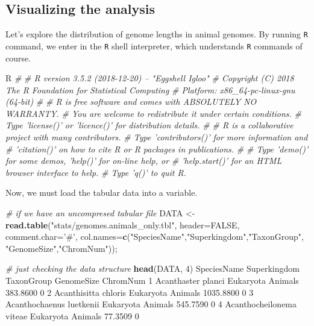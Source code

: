 \documentclass[10pt,a4paper,]{article}
\newenvironment{Shaded}{}{}
\newcommand{\CommentTok}[1]{\textcolor[rgb]{0.38,0.63,0.69}{\textit{#1}}}
\newcommand{\DataTypeTok}[1]{\textcolor[rgb]{0.56,0.13,0.00}{#1}}
\newcommand{\DecValTok}[1]{\textcolor[rgb]{0.25,0.63,0.44}{#1}}
\newcommand{\ExtensionTok}[1]{#1}
\newcommand{\FloatTok}[1]{\textcolor[rgb]{0.25,0.63,0.44}{#1}}
\newcommand{\KeywordTok}[1]{\textcolor[rgb]{0.00,0.44,0.13}{\textbf{#1}}}
\newcommand{\NormalTok}[1]{#1}
\newcommand{\OtherTok}[1]{\textcolor[rgb]{0.00,0.44,0.13}{#1}}
\newcommand{\StringTok}[1]{\textcolor[rgb]{0.25,0.44,0.63}{#1}}
\begin{document}
\hypertarget{visualizing-the-analysis}{%
\subsection{Visualizing the analysis}\label{visualizing-the-analysis}}

Let's explore the distribution of genome lengths in animal genomes. By
running \texttt{R} command, we enter in the \texttt{R} shell
interpreter, which understands \texttt{R} commands of course.

\begin{Shaded}
\begin{Highlighting}[]
\ExtensionTok{R}
\CommentTok{#}
\CommentTok{# R version 3.5.2 (2018-12-20) -- "Eggshell Igloo"}
\CommentTok{# Copyright (C) 2018 The R Foundation for Statistical Computing}
\CommentTok{# Platform: x86_64-pc-linux-gnu (64-bit)}
\CommentTok{#}
\CommentTok{# R is free software and comes with ABSOLUTELY NO WARRANTY.}
\CommentTok{# You are welcome to redistribute it under certain conditions.}
\CommentTok{# Type 'license()' or 'licence()' for distribution details.}
\CommentTok{#}
\CommentTok{# R is a collaborative project with many contributors.}
\CommentTok{# Type 'contributors()' for more information and}
\CommentTok{# 'citation()' on how to cite R or R packages in publications.}
\CommentTok{#}
\CommentTok{# Type 'demo()' for some demos, 'help()' for on-line help, or}
\CommentTok{# 'help.start()' for an HTML browser interface to help.}
\CommentTok{# Type 'q()' to quit R.}
\end{Highlighting}
\end{Shaded}

Now, we must load the tabular data into a variable.

\begin{Shaded}
\begin{Highlighting}[]
\CommentTok{# if we have an uncompresed tabular file}
\NormalTok{DATA <-}\StringTok{ }\KeywordTok{read.table}\NormalTok{(}\StringTok{"stats/genomes.animals_only.tbl"}\NormalTok{,}
                    \DataTypeTok{header=}\OtherTok{FALSE}\NormalTok{, }\DataTypeTok{comment.char=}\StringTok{'#'}\NormalTok{,}
                    \DataTypeTok{col.names=}\KeywordTok{c}\NormalTok{(}\StringTok{"SpeciesName"}\NormalTok{,}\StringTok{"Superkingdom"}\NormalTok{,}\StringTok{"TaxonGroup"}\NormalTok{,}
                                \StringTok{"GenomeSize"}\NormalTok{,}\StringTok{"ChromNum"}\NormalTok{));}

\CommentTok{# just checking the data structure}
\KeywordTok{head}\NormalTok{(DATA, }\DecValTok{4}\NormalTok{)}
\NormalTok{                  SpeciesName Superkingdom TaxonGroup GenomeSize ChromNum}
\DecValTok{1}\NormalTok{          Acanthaster planci    Eukaryota    Animals   }\FloatTok{383.8600}        \DecValTok{0}
\DecValTok{2}\NormalTok{        Acanthisitta chloris    Eukaryota    Animals  }\FloatTok{1035.8800}        \DecValTok{0}
\DecValTok{3}\NormalTok{    Acanthochaenus luetkenii    Eukaryota    Animals   }\FloatTok{545.7590}        \DecValTok{0}
\DecValTok{4}\NormalTok{    Acanthocheilonema viteae    Eukaryota    Animals    }\FloatTok{77.3509}        \DecValTok{0}
\end{Highlighting}
\end{Shaded}
\end{document}
